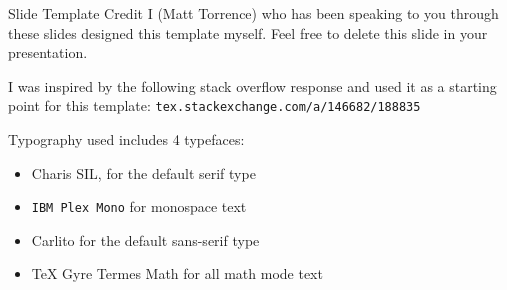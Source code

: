 \documentclass[aspectratio=169,usenames,dvipsnames]{beamer}
\begin{document}
\begin{frame}{Slide Template Credit}
I (Matt Torrence) who has been speaking to you through these slides designed this template myself. Feel free to delete this slide in your presentation.

\s I was inspired by the following stack overflow response and used it as a starting point for this template: \texttt{tex.stackexchange.com/a/146682/188835}

\s Typography used includes 4 typefaces:

\begin{itemize}
\item Charis SIL, for the default serif type
\item \texttt{IBM Plex Mono} for monospace text
\item {\sansstyle Carlito} for the default sans-serif type
\item TeX Gyre Termes Math for all math mode text
\end{itemize}


\end{frame}
\end{document}
